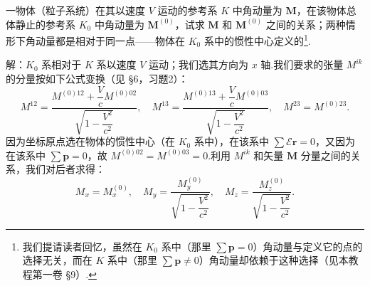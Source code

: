 \begin{xiti}

\quad 一物体（粒子系统）在其以速度 $V$ 运动的参考系 $K$ 中角动量为 $\boldsymbol{M}$，在该物体总体静止的参考系 $K_0$ 中角动量为 $\boldsymbol{M}^{(0)}$，试求 $\boldsymbol{M}$ 和 $\boldsymbol{M}^{(0)}$ 之间的关系；两种情形下角动量都是相对于同一点——物体在 $K_0$ 系中的惯性中心定义的\footnote{我们提请读者回忆，虽然在 $K_0$ 系中（那里 $\sum\boldsymbol{p}=0$）角动量与定义它的点的选择无关，而在 $K$ 系中（那里 $\sum\boldsymbol{p}\neq0$）角动量却依赖于这种选择（见本教程第一卷 §9）.}.

解：$K_0$ 系相对于 $K$ 系以速度 $V$ 运动；我们选其方向为 $x$ 轴.我们要求的张量 $M^{ik}$ 的分量按如下公式变换（见 §6，习题2）：
\begin{equation*}
  M^{12}=\frac{M^{(0)12}+\dfrac{V}{c}M^{(0)02}}{\sqrt{1-\dfrac{V^2}{c^2}}},\quad
  M^{13}=\frac{M^{(0)13}+\dfrac{V}{c}M^{(0)03}}{\sqrt{1-\dfrac{V^2}{c^2}}},\quad
  M^{23}=M^{(0)23}.
\end{equation*}
因为坐标原点选在物体的惯性中心（在 $K_0$ 系中），在该系中 $\sum\mathcal{E}\boldsymbol{r}=0$，又因为在该系中 $\sum\boldsymbol{p}=0$，故 $M^{(0)02}=M^{(0)03}=0$.利用 $M^{ik}$ 和矢量 $\boldsymbol{M}$ 分量之间的关系，我们对后者求得：
\begin{equation*}
  M_x=M_x^{(0)},\quad
  M_y=\frac{M_y^{(0)}}{\sqrt{1-\dfrac{V^2}{c^2}}},\quad
  M_z=\frac{M_z^{(0)}}{\sqrt{1-\dfrac{V^2}{c^2}}}.
\end{equation*}

\end{xiti}
